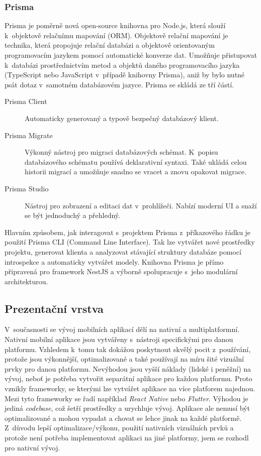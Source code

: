 \documentclass[thesis=M,czech]{FITthesis}[2019/12/23]
\begin{document}
\subsubsection{Prisma}
\label{doc:prisma}
Prisma je poměrně nová open-source knihovna pro Node.js, která slouží k~objektově relačnímu mapování (ORM). Objektově relační mapování je technika, která propojuje relační databázi a objektově orientovaným programovacím jazykem pomocí automatické konverze dat. Umožňuje přistupovat k~databázi prostřednictvím metod a objektů daného programovacího jazyka (TypeScript nebo JavaScript v~případě knihovny Prisma), aniž by bylo nutné psát dotaz v~samotném databázovém jazyce. Prisma se skládá ze tří částí.
\begin{description}
    \item[Prisma Client] Automaticky generovaný a typově bezpečný databázový klient.
    \item[Prisma Migrate] Výkonný nástroj pro migraci databázových schémat. K~popisu databázového schématu používá deklarativní syntaxi. Také ukládá celou historii migrací a umožňuje snadno se vracet a znovu opakovat migrace.
    \item[Prisma Studio] Nástroj pro zobrazení a editaci dat v~prohlížeči. Nabízí moderní UI a snaží se být jednoduchý a přehledný.
\end{description}
Hlavním způsobem, jak interagovat s~projektem Prisma z~příkazového řádku je použití Prisma CLI (Command Line Interface). Tak lze vytvářet nové prostředky projektu, generovat klienta a analyzovat stávající struktury databáze pomocí introspekce a automaticky vytvářet modely. Knihovna Prisma je přímo připravená pro framework NestJS a výborně spolupracuje s~jeho modulární architekturou. \cite{prisma, prisma-1}

\subsection{Prezentační vrstva}
V~současnosti se vývoj mobilních aplikací dělí na nativní a multiplatformní. Nativní mobilní aplikace jsou vytvářeny s~nástroji specifickými pro danou platformu. Vzhledem k~tomu tak dokážou poskytnout skvělý pocit z~používání, protože jsou výkonnější, optimalizované a také používají na míru šité vizuální prvky pro danou platformu. Nevýhodou jsou vyšší náklady (lidské i peněžní) na vývoj, neboť je potřeba vytvořit separátní aplikace pro každou platformu. Proto vznikly frameworky, se kterými lze vytvářet aplikace na více platforem najednou. Mezi tyto frameworky se řadí například \textit{React Native} nebo \textit{Flutter}. Výhodou je jediná \textit{codebase}, což šetří prostředky a urychluje vývoj. Aplikace ale nemusí být optimalizované a mohou vypadat a chovat se lehce jinak na každé platformě. Z~důvodu lepší optimalizace/výkonu, použití nativních vizuálních prvků a protože není potřeba implementovat aplikaci na jiné platformy, jsem se rozhodl pro nativní vývoj. \cite{native-vs-multiplatform}
\end{document}
